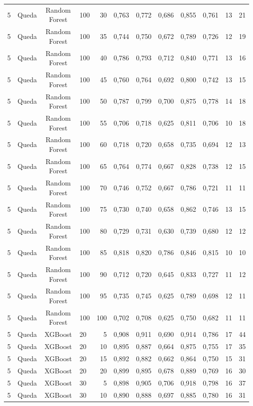\begin{longtable}{ccclrrrrrrrr}
5 & Queda & Random Forest & 100 & 30 & 0,763 & 0,772 & 0,686 & 0,855 & 0,761 & 13 & 21 \\
5 & Queda & Random Forest & 100 & 35 & 0,744 & 0,750 & 0,672 & 0,789 & 0,726 & 12 & 19 \\
5 & Queda & Random Forest & 100 & 40 & 0,786 & 0,793 & 0,712 & 0,840 & 0,771 & 13 & 16 \\
5 & Queda & Random Forest & 100 & 45 & 0,760 & 0,764 & 0,692 & 0,800 & 0,742 & 13 & 15 \\
5 & Queda & Random Forest & 100 & 50 & 0,787 & 0,799 & 0,700 & 0,875 & 0,778 & 14 & 18 \\
5 & Queda & Random Forest & 100 & 55 & 0,706 & 0,718 & 0,625 & 0,811 & 0,706 & 10 & 18 \\
5 & Queda & Random Forest & 100 & 60 & 0,718 & 0,720 & 0,658 & 0,735 & 0,694 & 12 & 13 \\
5 & Queda & Random Forest & 100 & 65 & 0,764 & 0,774 & 0,667 & 0,828 & 0,738 & 12 & 15 \\
5 & Queda & Random Forest & 100 & 70 & 0,746 & 0,752 & 0,667 & 0,786 & 0,721 & 11 & 11 \\
5 & Queda & Random Forest & 100 & 75 & 0,730 & 0,740 & 0,658 & 0,862 & 0,746 & 13 & 15 \\
5 & Queda & Random Forest & 100 & 80 & 0,729 & 0,731 & 0,630 & 0,739 & 0,680 & 12 & 12 \\
5 & Queda & Random Forest & 100 & 85 & 0,818 & 0,820 & 0,786 & 0,846 & 0,815 & 10 & 10 \\
5 & Queda & Random Forest & 100 & 90 & 0,712 & 0,720 & 0,645 & 0,833 & 0,727 & 11 & 12 \\
5 & Queda & Random Forest & 100 & 95 & 0,735 & 0,745 & 0,625 & 0,789 & 0,698 & 12 & 11 \\
5 & Queda & Random Forest & 100 & 100 & 0,702 & 0,708 & 0,625 & 0,750 & 0,682 & 11 & 11 \\
5 & Queda & XGBoost & 20 & 5 & 0,908 & 0,911 & 0,690 & 0,914 & 0,786 & 17 & 44 \\
5 & Queda & XGBoost & 20 & 10 & 0,895 & 0,887 & 0,664 & 0,875 & 0,755 & 17 & 35 \\
5 & Queda & XGBoost & 20 & 15 & 0,892 & 0,882 & 0,662 & 0,864 & 0,750 & 15 & 31 \\
5 & Queda & XGBoost & 20 & 20 & 0,899 & 0,895 & 0,678 & 0,889 & 0,769 & 16 & 30 \\
5 & Queda & XGBoost & 30 & 5 & 0,898 & 0,905 & 0,706 & 0,918 & 0,798 & 16 & 37 \\
5 & Queda & XGBoost & 30 & 10 & 0,890 & 0,888 & 0,697 & 0,885 & 0,780 & 16 & 31 \\

\end{longtable}
